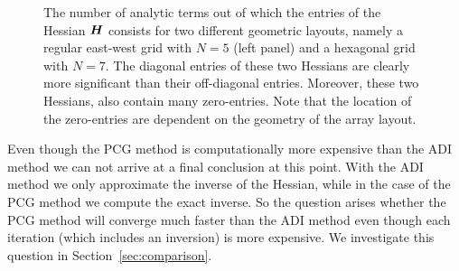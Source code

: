 \documentclass[useAMS,usenatbib]{mn2e}
\newcommand{\bH}{\bmath{H}}
\begin{document}
\begin{figure}
\centering
{}
\caption{The number of analytic terms out of which the entries of the Hessian $\bH$ consists for two different geometric layouts, namely a regular east-west grid with $N = 5$ (left panel) and 
a hexagonal grid with $N = 7$. The diagonal entries of these two Hessians are clearly more significant than their off-diagonal entries. Moreover, these two Hessians, also 
contain many zero-entries. Note that the location of the zero-entries are dependent on the geometry of the array layout.
\label{fig:hessian}} 
\end{figure}


Even though the PCG method is computationally more expensive than the ADI method we can not arrive at a final conclusion at this point. With the ADI method 
we only approximate the inverse of the Hessian, while in the case of the PCG method we compute the exact inverse. So the question arises whether the PCG method 
will converge much faster than the ADI method even though each iteration (which includes an inversion) is more expensive. We investigate this question in Section~\ref{sec:comparison}.
\end{document}
